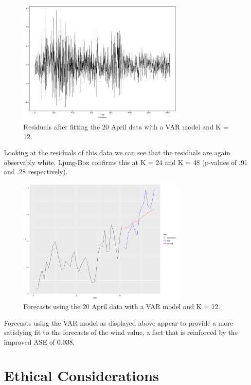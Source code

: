 \documentclass{llncs}
\begin{document}
\begin{figure}
  \centering
  \includegraphics[width=0.75\textwidth]{apr_20_var_residuals.png}
  \caption{Residuals after fitting the 20 April data with a VAR model and K = 12.}
  \label{fig:apr20varresiduals}
\end{figure}

Looking at the residuals of this data we can see that the residuals are again observably white. Ljung-Box confirms this at K = 24 and K = 48 (p-values of .91 and .28 respectively).

\begin{figure}[H]
  \centering
  \includegraphics[width=0.75\textwidth]{apr_20_var_forecasts.png}
  \caption{Forecasts using the 20 April data with a VAR model and K = 12.}
  \label{fig:apr20varforecasts}
\end{figure}

Forecasts using the VAR model as displayed above appear to provide a more satisfying fit to the forecasts of the wind value, a fact that is reinforced by the improved ASE of 0.038.

\section{Ethical Considerations}
\end{document}
